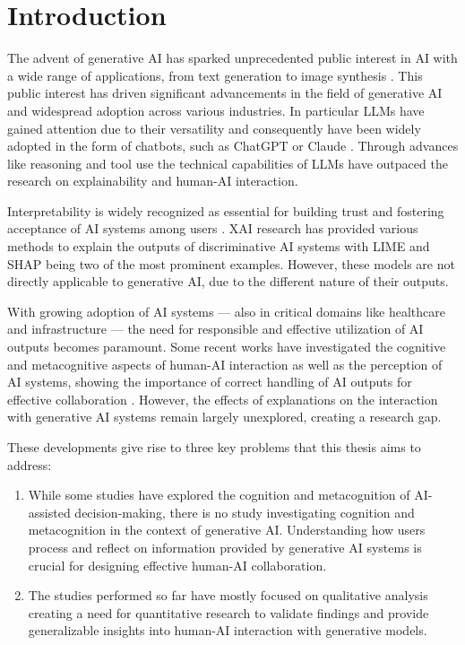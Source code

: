 \section{Introduction} \label{sec:introduction}

The advent of generative \ac{AI} has sparked unprecedented public interest in \ac{AI} with a wide range of applications, from text generation \parencite{OpenAI2022} to image synthesis \parencite{Rombach2021}. This public interest has driven significant advancements in the field of generative \ac{AI} and widespread adoption across various industries. In particular \acp{LLM} have gained attention due to their versatility and consequently have been widely adopted in the form of chatbots, such as ChatGPT \parencite{OpenAI2025} or Claude \parencite{AnthropicInc2025}. Through advances like reasoning \parencite{OpenAI2024a} and tool use \parencite{AnthropicInc2024} the technical capabilities of \acp{LLM} have outpaced the research on explainability and human-\ac{AI} interaction.

Interpretability is widely recognized as essential for building trust and fostering acceptance of \ac{AI} systems among users \parencite{Arrieta2020,Shin2021}. \ac{XAI} research has provided various methods to explain the outputs of discriminative \ac{AI} systems with LIME \parencite{Ribeiro2016} and SHAP \parencite{Lundberg2017} being two of the most prominent examples. However, these models are not directly applicable to generative \ac{AI}, due to the different nature of their outputs.

With growing adoption of \ac{AI} systems — also in critical domains like healthcare and infrastructure — the need for responsible and effective utilization of \ac{AI} outputs becomes paramount. Some recent works have investigated the cognitive and metacognitive aspects of human-\ac{AI} interaction as well as the perception of \ac{AI} systems, showing the importance of correct handling of \ac{AI} outputs for effective collaboration \parencite{Jussupow2021,Kazemitabaar2024}. However, the effects of explanations on the interaction with generative \ac{AI} systems remain largely unexplored, creating a research gap.

These developments give rise to three key problems that this thesis aims to address:

\begin{enumerate}
    \item While some studies have explored the cognition and metacognition of \ac{AI}-assisted decision-making, there is no study investigating cognition and metacognition in the context of generative \ac{AI}. Understanding how users process and reflect on information provided by generative \ac{AI} systems is crucial for designing effective human-\ac{AI} collaboration.
    \item The studies performed so far have mostly focused on qualitative analysis creating a need for quantitative research to validate findings and provide generalizable insights into human-\ac{AI} interaction with generative models.
\end{enumerate}

